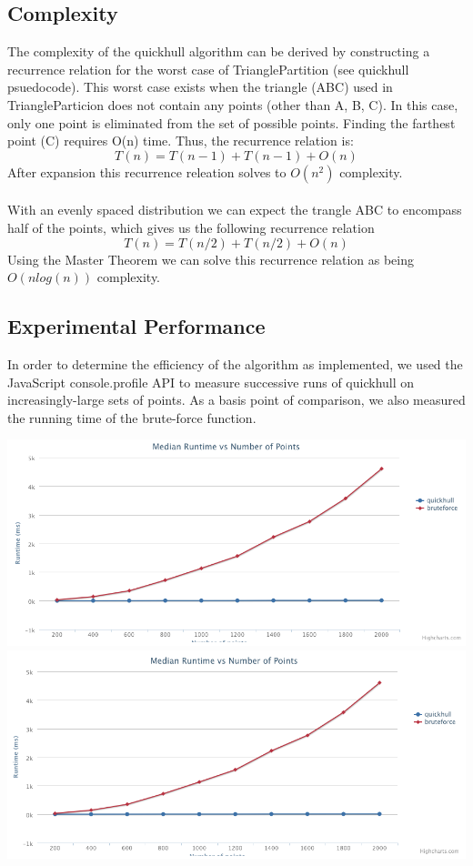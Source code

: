\documentclass[11pt]{article}
\begin{document}
\subsection{Complexity}
The complexity of the quickhull algorithm can be derived by constructing a recurrence relation for the worst case of TrianglePartition (see quickhull psuedocode). This worst case exists when the triangle (ABC) used in TriangleParticion does not contain any points (other than A, B, C). In this case, only one point is eliminated from the set of possible points. Finding the farthest point (C) requires O(n) time. Thus, the recurrence relation is:
\[ T(n) = T(n - 1) + T(n - 1) + O(n) \]
After expansion this recurrence releation solves to $O(n^2)$ complexity.
\\
\\
With an evenly spaced distribution we can expect the trangle ABC to encompass half of the points, which gives us the following recurrence relation
\[ T(n) = T(n / 2) + T(n / 2) + O(n) \]
Using the Master Theorem we can solve this recurrence relation as being $O(n log(n))$ complexity.

\subsection{Experimental Performance}
In order to determine the efficiency of the algorithm as implemented, we used the JavaScript console.profile API to measure successive runs of quickhull on increasingly-large sets of points. As a basis point of comparison, we also measured the running time of the brute-force function.

\includegraphics[scale=0.3]{quickhull - raphael-cloud.png} 
\includegraphics[scale=0.3]{quickhull - raphael-circle.png} 
\end{document}
